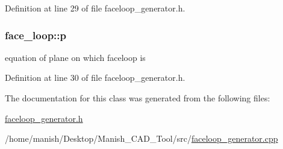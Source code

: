 Definition at line 29 of file faceloop\+\_\+generator.\+h.

\subsubsection[{\texorpdfstring{p}{p}}]{ face\+\_\+loop\+::p}\hypertarget{classface__loop_af184ff126eded4239b95693a8048c725}{}\label{classface__loop_af184ff126eded4239b95693a8048c725}


equation of plane on which faceloop is 



Definition at line 30 of file faceloop\+\_\+generator.\+h.



The documentation for this class was generated from the following files\+:\begin{DoxyCompactItemize}
\item 
\hyperlink{faceloop__generator_8h}{faceloop\+\_\+generator.\+h}\item 
/home/manish/\+Desktop/\+Manish\+\_\+\+C\+A\+D\+\_\+\+Tool/src/\hyperlink{faceloop__generator_8cpp}{faceloop\+\_\+generator.\+cpp}\end{DoxyCompactItemize}
